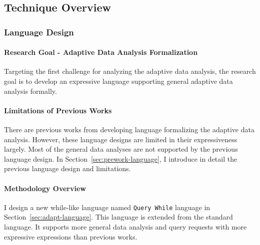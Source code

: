 \subsection{Technique Overview}
\label{sec:adapt-intro-overview}

\subsubsection{Language Design}
\paragraph*{Research Goal - Adaptive Data Analysis Formalization}
Targeting the first challenge
for analyzing the adaptive data analysis, 
the research goal is to develop
an expressive language supporting general adaptive data analysis formally.

\paragraph*{Limitations of Previous Works}
There are previous works from \cite{weihao22} developing language formalizing the adaptive data analysis.
However, these language designs are limited in their expressiveness largely.
Most of the general data analyses are not supported by the previous language design.
In Section~\ref{sec:prework-language}, I introduce in detail the previous language design and limitations.
%
\paragraph*{Methodology Overview}
I design a new while-like language 
named {\tt Query While} language in Section~\ref{sec:adapt-language}.
This language is extended from the standard language.
It supports more general data analysis and query requests with more expressive expressions than previous works.

